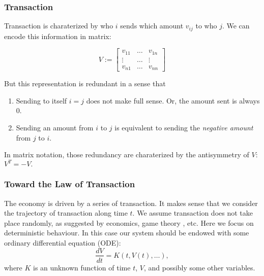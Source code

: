 \documentclass{beamer}
\newcommand{\transpose}[1]{{#1}^T}
\begin{document}
    \begin{frame}
        \frametitle{Transaction}
    
        Transaction is charaterized by who $i$ sends which amount $v_{ij}$ to who $j$. We can encode this information in matrix:

        \begin{equation}
            V := \begin{bmatrix}
                v_{11} & \dots & v_{1n} \\
                \vdots & \dots & \vdots \\
                v_{n1} & \dots & v_{nn}
            \end{bmatrix}                
        \end{equation}

        But this representation is redundant in a sense that
        \begin{enumerate}
            \item Sending to itself $i = j$ does not make full sense. Or, the amount sent is always 0.
            \item Sending an amount from $i$ to $j$ is equivalent to sending the \emph{negative amount} from $j$ to $i$.
        \end{enumerate}
        In matrix notation, those redundancy are charaterized by the antisymmetry of $V$: $\transpose{V} = - V.$

    \end{frame}

    \begin{frame}
        \frametitle{Toward the Law of Transaction}
    
        The economy is driven by a series of transaction.
        It makes sense that we consider the trajectory of transaction along time $t$. 
        We assume transaction does not take place randomly, as suggested by economics, game theory , etc.
        Here we focus on deterministic behaviour. In this case our system should be endowed with some ordinary differential equation (ODE):
        \begin{equation}
            \frac{d V}{d t} = K(t, V(t), \dots),
        \end{equation}
        where $K$ is an unknown function of time $t$, $V$, and possibly some other variables.

    \end{frame}
\end{document}
